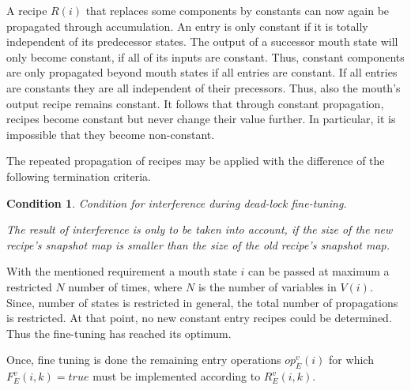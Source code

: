 \documentclass[12pt,a4paper]{scrartcl}
\newtheorem{condition}{Condition}
\begin{document}
A recipe $R(i)$ that replaces some components by constants can now again be
propagated through accumulation. An entry is only constant if it is totally
independent of its predecessor states. The output of a successor mouth state
will only become constant, if all of its inputs are constant. Thus, constant
components are only propagated beyond mouth states if all entries are constant.
If all entries are constants they are all independent of their precessors.
Thus, also the mouth's output recipe remains constant. It follows that through
constant propagation, recipes become constant but never change their value
further.  In particular, it is impossible that they become non-constant.

The repeated propagation of recipes may be applied with the difference of the
following termination criteria.

\begin{condition}
Condition for interference during dead-lock fine-tuning.

The result of interference is only to be taken into account, if the size of the
new recipe's snapshot map is smaller than the size of the old recipe's snapshot
map.  
\end{condition}

With the mentioned requirement a mouth state $i$ can be passed at maximum a
restricted $N$ number of times, where $N$ is the number of variables in
$V(i)$. Since, number of states is restricted in general, the total number of
propagations is restricted. At that point, no new constant entry recipes could
be determined. Thus the fine-tuning has reached its optimum.

Once, fine tuning is done the remaining entry operations $op_E^v(i)$ for which
$F_E^v(i,k)=true$ must be implemented according to $R_E^v(i,k)$.
\end{document}
